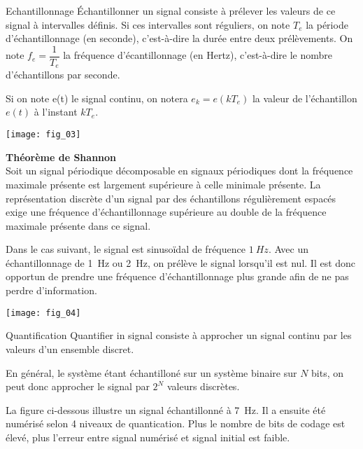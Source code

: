 \begin{defi}{Echantillonnage}
Échantillonner un signal consiste à prélever les valeurs de ce signal à intervalles définis. Si ces intervalles sont réguliers, on note $T_e$ la période d'échantillonnage (en seconde), c'est-à-dire la durée entre deux prélèvements. On note $f_e = \dfrac{1}{T_e}$ la fréquence d'écantillonnage (en Hertz), c'est-à-dire le nombre d'échantillons par seconde.

Si on note e(t) le signal continu, on notera $e_k = e(kT_e)$ la valeur de l'échantillon $e(t)$ à l'instant $kT_e$. 

\end{defi}

\begin{center}
\texttt{[image: fig\_03]}
\end{center}

\begin{theorem}{\small{\textsf{\textbf{Théorème de Shannon}}}} ~\\
Soit un signal périodique décomposable en signaux périodiques dont la fréquence maximale présente est largement supérieure à celle minimale présente.
La représentation discrète d’un signal par des échantillons régulièrement espacés exige une fréquence d’échantillonnage supérieure au double de la fréquence maximale présente dans ce signal.
\end{theorem}

Dans le cas suivant, le signal est sinusoïdal de fréquence $\SI{1}{Hz}$. Avec un échantillonnage de \SI{1}{Hz} ou \SI{2}{Hz}, on prélève le signal lorsqu'il est nul. Il est donc opportun de prendre une fréquence d'échantillonnage plus grande afin de ne pas perdre d'information. 
\begin{center}
\texttt{[image: fig\_04]}
\end{center}




\begin{defi}{Quantification}
Quantifier in signal consiste à approcher un signal continu par les valeurs d'un ensemble discret. 

En général, le système étant échantilloné sur un système binaire sur $N$ bits, on peut donc approcher le signal par $2^N$ valeurs discrètes.
\end{defi}

La figure ci-dessous illustre un signal échantillonné à \SI{7}{Hz}. Il a ensuite été numérisé selon 4 niveaux de quantication. Plus le nombre de bits de codage est élevé, plus l'erreur entre signal numérisé et signal initial est faible.
 
